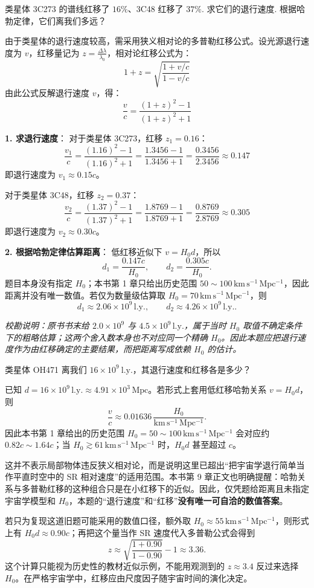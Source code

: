 \begin{exercise}\label{ex:21.5}
类星体 3C273 的谱线红移了 $16\%$、3C48 红移了 $37\%$. 求它们的退行速度. 根据哈勃定律，它们离我们多远？
\end{exercise}
\begin{solution}
由于类星体的退行速度较高，需采用狭义相对论的多普勒红移公式。设光源退行速度为 $v$，红移量记为 $z = \frac{\Delta \lambda}{\lambda_0}$，相对论红移公式为：
$$ 1 + z = \sqrt{\frac{1 + v/c}{1 - v/c}} $$
由此公式反解退行速度 $v$，得：
$$ \frac{v}{c} = \frac{(1+z)^2 - 1}{(1+z)^2 + 1} $$

\textbf{1. 求退行速度}：
对于类星体 3C273，红移 $z_1 = 0.16$：
$$ \frac{v_1}{c} = \frac{(1.16)^2 - 1}{(1.16)^2 + 1} = \frac{1.3456 - 1}{1.3456 + 1} = \frac{0.3456}{2.3456} \approx 0.147 $$
即退行速度为 $v_1 \approx 0.15 c$。

对于类星体 3C48，红移 $z_2 = 0.37$：
$$ \frac{v_2}{c} = \frac{(1.37)^2 - 1}{(1.37)^2 + 1} = \frac{1.8769 - 1}{1.8769 + 1} = \frac{0.8769}{2.8769} \approx 0.305 $$
即退行速度为 $v_2 \approx 0.30 c$。

\textbf{2. 根据哈勃定律估算距离}：
低红移近似下 $v=H_0d$，所以
$$ d_1=\frac{0.147c}{H_0},\qquad d_2=\frac{0.305c}{H_0}. $$
题目本身没有指定 $H_0$；本书第 1 章只给出历史范围 $50\sim100\,\mathrm{km\,s^{-1}\,Mpc^{-1}}$，因此距离并没有唯一数值。若仅为数量级估算取 $H_0=70\,\mathrm{km\,s^{-1}\,Mpc^{-1}}$，则
$$ d_1\approx2.06\times10^9\,\mathrm{l.y.},\qquad
   d_2\approx4.26\times10^9\,\mathrm{l.y.}. $$

\textit{校勘说明：原书书末给 $2.0\times10^9$ 与 $4.5\times10^9\,\mathrm{l.y.}$，属于当时 $H_0$ 取值不确定条件下的粗略估算；这两个舍入数本身也不对应同一个精确 $H_0$。因此本题应把退行速度作为由红移确定的主要结果，而把距离写成依赖 $H_0$ 的估计。}
\end{solution}

\begin{exercise}\label{ex:21.6}
类星体 OH471 离我们 $16 \times 10^9 \ \mathrm{l.y.}$，其退行速度和红移各是多少？
\end{exercise}
\begin{solution}
已知 $d=16\times10^9\,\mathrm{l.y.}\approx4.91\times10^3\,\mathrm{Mpc}$。若形式上套用低红移哈勃关系 $v=H_0d$，则
$$
\frac{v}{c}\approx0.01636\,
\frac{H_0}{\mathrm{km\,s^{-1}\,Mpc^{-1}}}.
$$
因此本书第 1 章给出的历史范围 $H_0=50\sim100\,\mathrm{km\,s^{-1}\,Mpc^{-1}}$ 会对应约 $0.82c\sim1.64c$；当 $H_0\gtrsim61\,\mathrm{km\,s^{-1}\,Mpc^{-1}}$ 时，$H_0d$ 甚至超过 $c$。

这并不表示局部物体违反狭义相对论，而是说明这里已超出“把宇宙学退行简单当作平直时空中的 SR 相对速度”的适用范围。本书第 9 章正文也明确提醒：哈勃关系与多普勒红移的这种组合只是在小红移下的近似。因此，仅凭题给距离且未指定宇宙学模型和 $H_0$，本题的“退行速度”和“红移”\textbf{没有唯一可自洽的数值答案}。

若只为复现这道旧题可能采用的数值口径，额外取 $H_0\approx55\,\mathrm{km\,s^{-1}\,Mpc^{-1}}$，则形式上有 $H_0d\approx0.90c$；再把这个量当作 SR 速度代入多普勒公式会得到
$$ z\approx\sqrt{\frac{1+0.90}{1-0.90}}-1\approx3.36. $$
这个计算只能视为历史性的教材近似示例，不能用观测到的 $z\approx3.4$ 反过来选择 $H_0$。在严格宇宙学中，红移应由尺度因子随宇宙时间的演化决定。
\end{solution}

